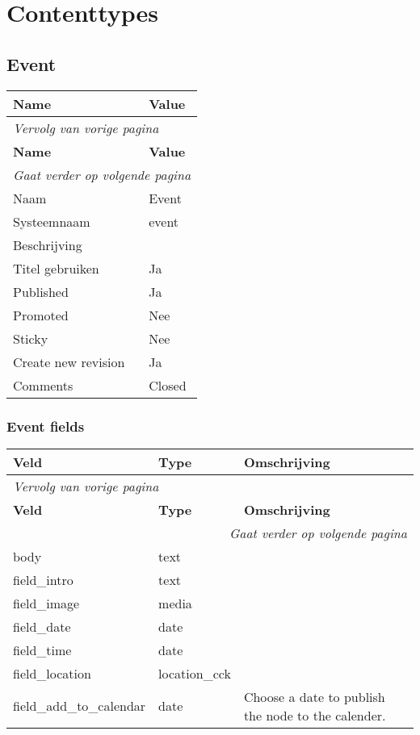 \section{Contenttypes}\label{contenttypes}

\subsection{Event}
\label{sec:content-event}
  \begin{longtable}{| p{7.50cm}|p{7.50cm}|}
  \hline
  \rowcolor{tableheader}
  \textbf{Name} & \textbf{Value}  \tabularnewline
  \hline
\endfirsthead
\multicolumn{2}{l}{\textit{Vervolg van vorige pagina}} \\
\hline
\rowcolor{tableheader}
  \textbf{Name} & \textbf{Value}  \tabularnewline
  \hline
\hline
\endhead
\multicolumn{2}{r}{\textit{Gaat verder op volgende pagina}} \\
\endfoot
\hline
\endlastfoot
  Naam & Event  \tabularnewline
  \hline
  Systeemnaam & event  \tabularnewline
  \hline
  Beschrijving &   \tabularnewline
  \hline
  Titel gebruiken & Ja  \tabularnewline
  \hline
  Published & Ja  \tabularnewline
  \hline
  Promoted & Nee  \tabularnewline
  \hline
  Sticky & Nee  \tabularnewline
  \hline
  Create new revision & Ja  \tabularnewline
  \hline
  Comments & Closed  \tabularnewline
  \hline
  \end{longtable}

\subsubsection{Event fields}
  \begin{longtable}{| p{5.00cm}|p{5.00cm}|p{5.00cm}|}
  \hline
  \rowcolor{tableheader}
  \textbf{Veld} & \textbf{Type} & \textbf{Omschrijving}  \tabularnewline
  \hline
\endfirsthead
\multicolumn{3}{l}{\textit{Vervolg van vorige pagina}} \\
\hline
\rowcolor{tableheader}
  \textbf{Veld} & \textbf{Type} & \textbf{Omschrijving}  \tabularnewline
  \hline
\hline
\endhead
\multicolumn{3}{r}{\textit{Gaat verder op volgende pagina}} \\
\endfoot
\hline
\endlastfoot
  body & text &   \tabularnewline
  \hline
  field\_intro & text &   \tabularnewline
  \hline
  field\_image & media &   \tabularnewline
  \hline
  field\_date & date &   \tabularnewline
  \hline
  field\_time & date &   \tabularnewline
  \hline
  field\_location & location\_cck &   \tabularnewline
  \hline
  field\_add\_to\_calendar & date & Choose a date to publish the node to the calender.  \tabularnewline
  \hline
  \end{longtable}

